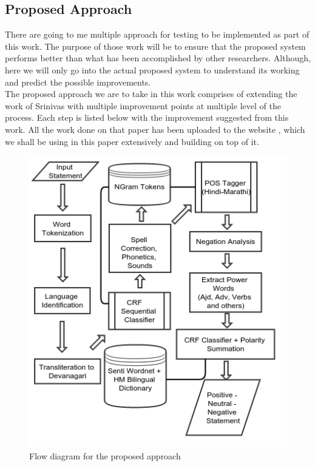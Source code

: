 \documentclass[12pt]{article}
\begin{document}
\subsection{Proposed Approach}

\fontsize{12}{20}\selectfont There are going to me multiple approach for testing to be implemented as part
of this work. The purpose of those work will be to ensure that the proposed
system performs better than what has been accomplished by other researchers.
Although, here we will only go into the actual proposed system to understand
its working and predict the possible improvements.\\
The proposed approach we are to take in this work comprises of extending the
work of Srinivas \cite{shashank_sharma_sentiment_????} with multiple
improvement points at multiple level of the process. Each step is listed below
with the improvement suggested from this work. All the work done on that paper
has been uploaded to the website \cite{_linguistic_????}, which we shall be
using in this paper extensively and building on top of it. \\

\begin{figure}[ht!]
    \includegraphics[width=140mm]{polarity-pickup.png}
    \caption{Flow diagram for the proposed approach}
\end{figure}
\end{document}
